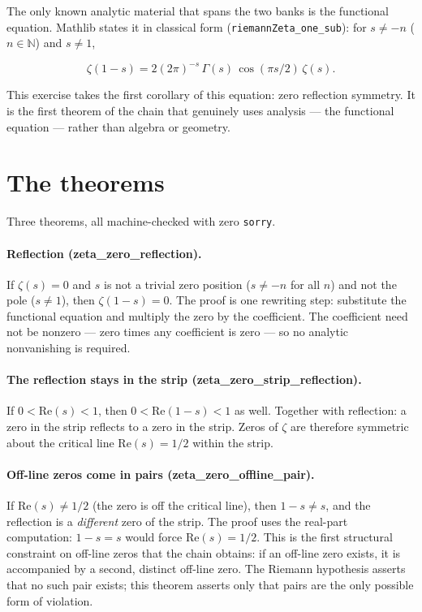 \documentclass[sigplan,10pt,anonymous,review]{acmart}
\begin{document}
The only known analytic material that spans the two banks is the
functional equation. Mathlib states it in classical form
(\texttt{riemannZeta\_one\_sub}): for $s \ne -n$ ($n \in \mathbb{N}$)
and $s \ne 1$,

\[
\zeta(1-s) = 2(2\pi)^{-s}\,\Gamma(s)\,\cos(\pi s / 2)\,\zeta(s).
\]

This exercise takes the first corollary of this equation: zero
reflection symmetry. It is the first theorem of the chain that genuinely
uses analysis --- the functional equation --- rather than algebra or
geometry.

\section{The theorems}

Three theorems, all machine-checked with zero \texttt{sorry}.

\paragraph{Reflection (zeta\_zero\_reflection).} If $\zeta(s) = 0$ and
$s$ is not a trivial zero position ($s \ne -n$ for all $n$) and not the
pole ($s \ne 1$), then $\zeta(1-s) = 0$. The proof is one rewriting
step: substitute the functional equation and multiply the zero by the
coefficient. The coefficient need not be nonzero --- zero times any
coefficient is zero --- so no analytic nonvanishing is required.

\paragraph{The reflection stays in the strip (zeta\_zero\_strip\_reflection).}
If $0 < \mathrm{Re}(s) < 1$, then $0 < \mathrm{Re}(1-s) < 1$ as well.
Together with reflection: a zero in the strip reflects to a zero in the
strip. Zeros of $\zeta$ are therefore symmetric about the critical line
$\mathrm{Re}(s) = 1/2$ within the strip.

\paragraph{Off-line zeros come in pairs (zeta\_zero\_offline\_pair).}
If $\mathrm{Re}(s) \ne 1/2$ (the zero is off the critical line), then
$1-s \ne s$, and the reflection is a \emph{different} zero of the strip.
The proof uses the real-part computation: $1-s = s$ would force
$\mathrm{Re}(s) = 1/2$. This is the first structural constraint on
off-line zeros that the chain obtains: if an off-line zero exists, it is
accompanied by a second, distinct off-line zero. The Riemann hypothesis
asserts that no such pair exists; this theorem asserts only that pairs
are the only possible form of violation.
\end{document}
